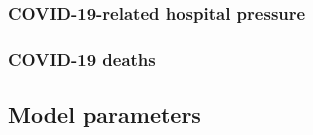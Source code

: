 \subsubsection{COVID-19-related hospital pressure}
\label{hosp}
 

\subsubsection{COVID-19 deaths}
 


\subsection{Model parameters}
\label{parameters}

